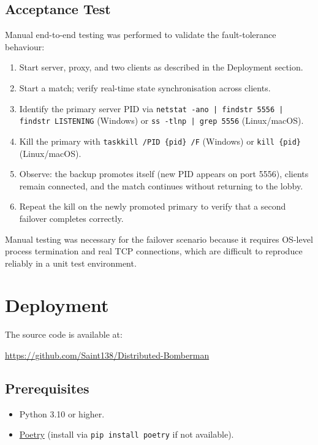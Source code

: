 \documentclass{scrartcl}
\begin{document}
\subsection{Acceptance Test}\label{acceptance-test}

Manual end-to-end testing was performed to validate the fault-tolerance behaviour:

\begin{enumerate}
    \item Start server, proxy, and two clients as described in the Deployment section.
    \item Start a match; verify real-time state synchronisation across clients.
    \item Identify the primary server PID via \texttt{netstat -ano | findstr 5556 | findstr LISTENING} (Windows) or \texttt{ss -tlnp | grep 5556} (Linux/macOS).
    \item Kill the primary with \texttt{taskkill /PID \{pid\} /F} (Windows) or \texttt{kill \{pid\}} (Linux/macOS).
    \item Observe: the backup promotes itself (new PID appears on port 5556), clients remain connected, and the match continues without returning to the lobby.
    \item Repeat the kill on the newly promoted primary to verify that a second failover completes correctly.
\end{enumerate}

Manual testing was necessary for the failover scenario because it requires OS-level process termination and real TCP connections, which are difficult to reproduce reliably in a unit test environment.

\section{Deployment}\label{deployment}

The source code is available at:
\begin{center}
\url{https://github.com/Saint138/Distributed-Bomberman}
\end{center}

\subsection{Prerequisites}

\begin{itemize}
    \item Python 3.10 or higher.
    \item \href{https://python-poetry.org/docs/#installation}{Poetry} (install via \texttt{pip install poetry} if not available).
\end{itemize}
\end{document}
